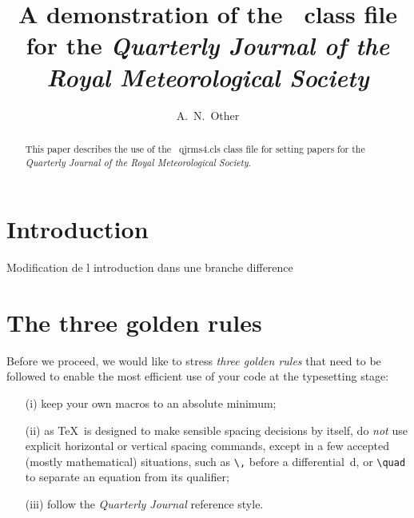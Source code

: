 \documentclass[times]{qjrms4}
\begin{document}

\title{A demonstration of the \LaTeXe\ class file for
the \itshape{Quarterly Journal of the Royal Meteorological
Society}\footnotemark[2]}

\author{A.~N.~Other\corrauth}

\address{John Wiley \& Sons, Ltd, The Atrium, Southern Gate, Chichester,
West Sussex, PO19~8SQ, UK}


\begin{abstract}
This paper describes the use of the \LaTeXe\ \textsf{qjrms4.cls}
class file for setting papers for the \emph{Quarterly Journal of
the Royal Meteorological Society}.
\end{abstract}


\maketitle


\section{Introduction} Modification de l introduction dans une branche difference

\section{The three golden rules} Before we proceed, we would like to
stress \emph{three golden rules} that need to be followed to
enable the most efficient use of your code at the typesetting
stage:
\begin{enumerate}
\item[(i)] keep your own macros to an absolute minimum;
\item[(ii)] as \TeX\ is designed to make sensible spacing
decisions by itself, do \emph{not} use explicit horizontal or
vertical spacing commands, except in a few accepted (mostly
mathematical) situations, such as \verb"\," before a
differential~d, or \verb"\quad" to separate an equation from its
qualifier;
\item[(iii)] follow the \emph{Quarterly Journal}
reference style.
\end{enumerate}
\end{document}
